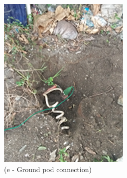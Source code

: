 \begin{figure}[!h]
\begin{minipage}[b]{0.3\linewidth}
	\includegraphics[width=\textwidth]{figures/fig_ch04_elecaudit_grounding_groundpod}
	\caption*{(e - Ground pod connection)}
\end{minipage}
	\hspace{0.03cm}
\begin{minipage}[b]{0.3\linewidth}
	\centering

\end{minipage}
\end{figure}

